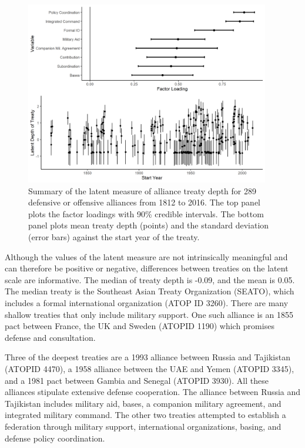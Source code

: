 \documentclass[12pt]{article}
\begin{document}
\begin{figure}
	\centering
		\includegraphics[width=0.95\textwidth]{../figures/ld-summary.png}
	\caption{Summary of the latent measure of alliance treaty depth for 289 defensive or offensive alliances from 1812 to 2016. The top panel plots the factor loadings with 90\% credible intervals. The bottom panel plots mean treaty depth (points) and the standard deviation (error bars) against the start year of the treaty.}
	\label{fig:ld-summary}
\end{figure}


Although the values of the latent measure are not intrinsically meaningful and can therefore be positive or negative, differences between treaties on the latent scale are informative. 
The median of treaty depth is -0.09, and the mean is 0.05. 
The median treaty is the Southeast Asian Treaty Organization (SEATO), which includes a formal international organization (ATOP ID 3260). 
There are many shallow treaties that only include military support. 
One such alliance is an 1855 pact between France, the UK and Sweden (ATOPID 1190) which promises defense and consultation. 


Three of the deepest treaties are a 1993 alliance between Russia and Tajikistan (ATOPID 4470), a 1958 alliance between the UAE and Yemen (ATOPID 3345), and a 1981 pact between Gambia and Senegal (ATOPID 3930). 
All these alliances stipulate extensive defense cooperation. 
The alliance between Russia and Tajikistan includes military aid, bases, a companion military agreement, and integrated military command. 
The other two treaties attempted to establish a federation through military support, international organizations, basing, and defense policy coordination.
\end{document}
